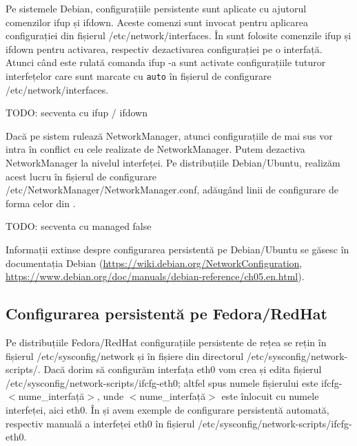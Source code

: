 Pe sistemele Debian, configurațiile persistente sunt aplicate cu ajutorul comenzilor ifup și ifdown. Aceste comenzi sunt invocat pentru aplicarea configurației din fișierul /etc/network/interfaces. În  sunt folosite comenzile ifup și ifdown pentru activarea, respectiv dezactivarea configurației pe o interfață. Atunci când este rulată comanda ifup -a sunt activate configurațiile tuturor interfețelor care sunt marcate cu \texttt{auto} în fișierul de configurare /etc/network/interfaces.

\begin{screen}[caption={Activarea și dezactivarea configurației persistente},label={lst:net:enable-persistent}]
TODO: secventa cu ifup / ifdown
\end{screen}

Dacă pe sistem rulează NetworkManager, atunci configurațiile de mai sus vor intra în conflict cu cele realizate de NetworkManager. Putem dezactiva NetworkManager la nivelul interfeței. Pe distribuțiile Debian/Ubuntu, realizăm acest lucru în fișierul de configurare /etc/NetworkManager/NetworkManager.conf, adăugând linii de configurare de forma celor din .

\begin{screen}[caption={Dezactivare NetworkManager la nivelul interfeței în Debian},label={lst:net:disable-nm-if-debian}]
TODO: secventa cu managed false
\end{screen}

Informații extinse despre configurarea persistentă pe Debian/Ubuntu se găsesc în documentația Debian (\url{https://wiki.debian.org/NetworkConfiguration}, \url{https://www.debian.org/doc/manuals/debian-reference/ch05.en.html}).

\subsection{Configurarea persistentă pe Fedora/RedHat}
\label{sec:net:persistent-config-redhat}

Pe distribuțiile Fedora/RedHat configurațiile persistente de rețea se rețin în fișierul /etc/sysconfig/network și în fișiere din directorul /etc/sysconfig/network-scripts/. Dacă dorim să configurăm interfața eth0 vom crea și edita fișierul /etc/sysconfig/network-scripts/ifcfg-eth0; altfel spus numele fișierului este ifcfg-$<$nume_interfață$>$, unde $<$nume_interfață$>$ este înlocuit cu numele interfeței, aici eth0. În  și  avem exemple de configurare persistentă automată, respectiv manuală a interfeței eth0 în fișierul /etc/sysconfig/network-scripts/ifcfg-eth0.

